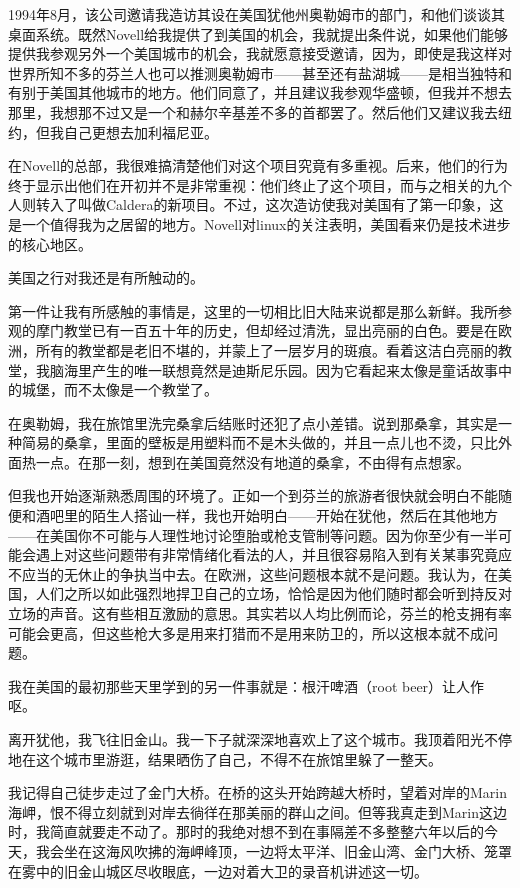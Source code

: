 1994年8月，该公司邀请我造访其设在美国犹他州奥勒姆市的部门，和他们谈谈其桌面系统。既然Novell给我提供了到美国的机会，我就提出条件说，如果他们能够提供我参观另外一个美国城市的机会，我就愿意接受邀请，因为，即使是我这样对世界所知不多的芬兰人也可以推测奥勒姆市——甚至还有盐湖城——是相当独特和有别于美国其他城市的地方。他们同意了，并且建议我参观华盛顿，但我并不想去那里，我想那不过又是一个和赫尔辛基差不多的首都罢了。然后他们又建议我去纽约，但我自己更想去加利福尼亚。

在Novell的总部，我很难搞清楚他们对这个项目究竟有多重视。后来，他们的行为终于显示出他们在开初并不是非常重视：他们终止了这个项目，而与之相关的九个人则转入了叫做Caldera的新项目。不过，这次造访使我对美国有了第一印象，这是一个值得我为之居留的地方。Novell对linux的关注表明，美国看来仍是技术进步的核心地区。

美国之行对我还是有所触动的。

第一件让我有所感触的事情是，这里的一切相比旧大陆来说都是那么新鲜。我所参观的摩门教堂已有一百五十年的历史，但却经过清洗，显出亮丽的白色。要是在欧洲，所有的教堂都是老旧不堪的，并蒙上了一层岁月的斑痕。看着这洁白亮丽的教堂，我脑海里产生的唯一联想竟然是迪斯尼乐园。因为它看起来太像是童话故事中的城堡，而不太像是一个教堂了。

在奥勒姆，我在旅馆里洗完桑拿后结账时还犯了点小差错。说到那桑拿，其实是一种简易的桑拿，里面的壁板是用塑料而不是木头做的，并且一点儿也不烫，只比外面热一点。在那一刻，想到在美国竟然没有地道的桑拿，不由得有点想家。

但我也开始逐渐熟悉周围的环境了。正如一个到芬兰的旅游者很快就会明白不能随便和酒吧里的陌生人搭讪一样，我也开始明白——开始在犹他，然后在其他地方——在美国你不可能与人理性地讨论堕胎或枪支管制等问题。因为你至少有一半可能会遇上对这些问题带有非常情绪化看法的人，并且很容易陷入到有关某事究竟应不应当的无休止的争执当中去。在欧洲，这些问题根本就不是问题。我认为，在美国，人们之所以如此强烈地捍卫自己的立场，恰恰是因为他们随时都会听到持反对立场的声音。这有些相互激励的意思。其实若以人均比例而论，芬兰的枪支拥有率可能会更高，但这些枪大多是用来打猎而不是用来防卫的，所以这根本就不成问题。

我在美国的最初那些天里学到的另一件事就是：根汗啤酒（root beer）让人作呕。

离开犹他，我飞往旧金山。我一下子就深深地喜欢上了这个城市。我顶着阳光不停地在这个城市里游逛，结果晒伤了自己，不得不在旅馆里躲了一整天。

我记得自己徒步走过了金门大桥。在桥的这头开始跨越大桥时，望着对岸的Marin海岬，恨不得立刻就到对岸去徜徉在那美丽的群山之间。但等我真走到Marin这边时，我简直就要走不动了。那时的我绝对想不到在事隔差不多整整六年以后的今天，我会坐在这海风吹拂的海岬峰顶，一边将太平洋、旧金山湾、金门大桥、笼罩在雾中的旧金山城区尽收眼底，一边对着大卫的录音机讲述这一切。

